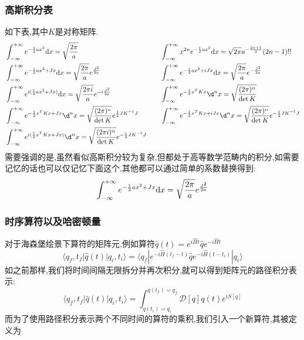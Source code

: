 \subsubsection{高斯积分表}
如下表,其中$ K $是对称矩阵.
\begin{equation}\label{GaussIntegral}
	\begin{aligned}{2}
		&\int_{-\infty}^{+\infty} e^{-\frac{1}{2}ax^{2}}\dx=\sqrt{\frac{2\pi}{a}} &\quad
		&\int_{-\infty}^{+\infty}x^{2n}e^{-\frac12ax^2}\dx=\sqrt{2\pi}a^{-\frac{2n+1}2}(2n-1)!! \\
		&\int_{-\infty}^{+\infty}e^{-\frac12ax^2+Jx}\dx=\sqrt{\frac{2\pi}a}e^{\frac{J^2}{2a}} &
		&\int_{-\infty}^{+\infty} e^{-\frac{1}{2} ax^{2}+iJx} \dx=\sqrt{\frac{2\pi}{a}}e^{-\frac{J^{2}}{2a}} \\
		&\int_{-\infty}^{+\infty}e^{i(\frac{1}{2}ax^{2}+Jx)}\dx=\sqrt{\frac{2\pi i}{a}}e^{-i\frac{J^{2}}{2a}} &
		&\int_{-\infty}^{+\infty}e^{-\frac{1}{2}x^{T}Kx}\d^{n}x=\sqrt{\frac{(2\pi)^{n}}{\det K}} \\
		&\int_{-\infty}^{+\infty}e^{-\frac{1}{2}x^{T}Kx+Jx}\d^{n}x=\sqrt{\frac{(2\pi)^{n}}{\det K}}e^{\frac{1}{2}JK^{-1}J} &
		&\int_{-\infty}^{+\infty}e^{-\frac{1}{2}x^{T}Kx+iJx}\d^{n}x=\sqrt{\frac{(2\pi)^{n}}{\det K}}e^{-\frac{1}{2}JK^{-1}J} \\
		&\int_{-\infty}^{+\infty}e^{i(\frac{1}{2}x^{T}Kx+Jx)}\d^{n}x=\sqrt{\frac{(2\pi i)^{n}}{\det K}}e^{-\frac{i}{2}JK^{-1}J}
	\end{aligned}
\end{equation}
需要强调的是,虽然看似高斯积分较为复杂,但都处于高等数学范畴内的积分,如需要记忆的话也可以仅记忆下面这个,其他都可以通过简单的系数替换得到:
\begin{equation}
	\int_{-\infty}^{+\infty}e^{-\frac12ax^2+Jx}\mathrm{d}x=\sqrt{\frac{2\pi}a}e^{\frac{J^2}{2a}}
\end{equation}
\subsubsection{时序算符以及哈密顿量}
对于海森堡绘景下算符的矩阵元,例如算符$\hat{q}(t)=e^{i\hat{H}t}\hat{q}e^{-i\hat{H}t}$
\begin{equation}
	\langle q_f,t_f|\hat{q}(t)|q_i,t_i\rangle=\langle q_f|e^{-i\hat{H}(t_f-t)}\hat{q}e^{-i\hat{H}(t-t_i)}|q_i\rangle 
\end{equation}
如之前那样,我们将时间间隔无限拆分并再次积分,就可以得到矩阵元的路径积分表示:
\begin{equation}
	\langle q_f,t_f|\hat{q}(t)|q_i,t_i\rangle=\int_{q(t_i)=q_i}^{q(t_f)=q_f}\mathcal{D}[q] q(t)e^{iS[q]}
\end{equation}
而为了使用路径积分表示两个不同时间的算符的乘积,我们引入一个新算符,其被定义为\\

